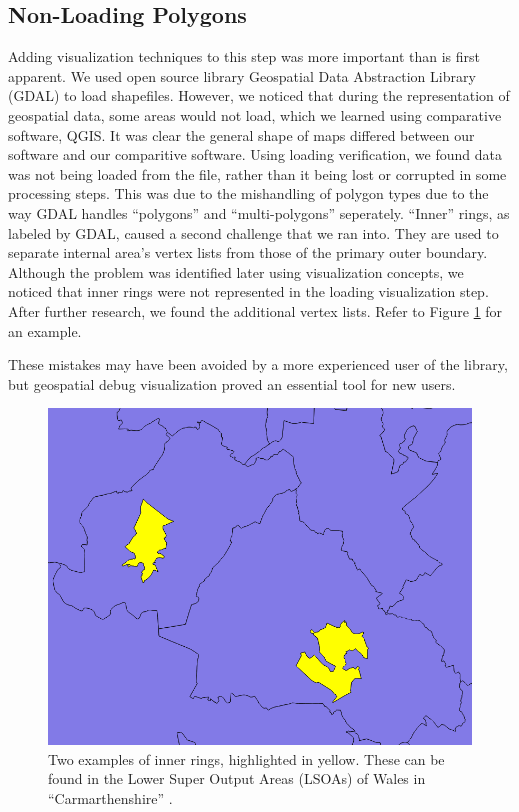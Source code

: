 \subsection{Non-Loading Polygons}
Adding visualization techniques to this step was more important than is first apparent. We used open source library Geospatial Data Abstraction Library (GDAL) \cite{GDAL} to load shapefiles. However, we noticed that during the representation of geospatial data, some areas would not load, which we learned using comparative software, QGIS. It was clear the general shape of maps differed between our software and our comparitive software. Using loading verification, we found data was not being loaded from the file, rather than it being lost or corrupted in some processing steps. This was due to the mishandling of polygon types due to the way GDAL handles ``polygons'' and ``multi-polygons'' seperately. ``Inner'' rings, as labeled by GDAL, caused a second challenge that we ran into. They are used to separate internal area's vertex lists from those of the primary outer boundary. Although the problem was identified later using visualization concepts, we noticed that inner rings were not represented in the loading visualization step. After further research, we found the additional vertex lists. Refer to Figure \ref{fig:rings} for an example.


These mistakes may have been avoided by a more experienced user of the library, but geospatial debug visualization proved an essential tool for new users.

\begin{figure}[t]
\includegraphics[width=0.4\linewidth]{images/ch6/innerRings}
\caption{Two examples of inner rings, highlighted in yellow. These can be found in the Lower Super Output Areas (LSOAs) of Wales in ``Carmarthenshire'' \cite{wales}.} \label{fig:rings}
\end{figure}

